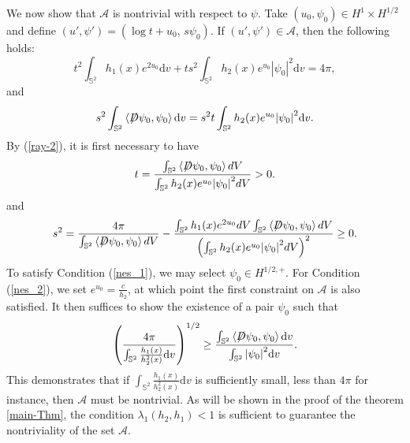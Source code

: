 \documentclass[a4paper, 12pt]{article}
\def\slashiii#1{\setbox0=\hbox{$#1$}#1\hskip-\wd0\hbox to\wd0{\hss\sl/\/\hss}}
\begin{document}
We now show that \(\mathcal{A}\) is nontrivial with respect to $\psi$. Take \((u_0, \psi_0) \in H^1 \times H^{1/2}\) and define \((u', \psi') = (\log t + u_0,\, s\psi_0)\). If \((u', \psi') \in \mathcal{A}\), then the following holds:
\begin{equation}\label{ray-1}
	{t^2}\int_{{\mathbb{S}^2}} {{h_1}(x){e^{2{u_0}}}} {\text{d}}v + t{s^2}\int_{{\mathbb{S}^2}} {{h_2}(x){e^{{u_0}}}{{\left| {{\psi _0}} \right|}^2}} {\text{d}}v = 4\pi,
\end{equation}
and
\begin{equation}\label{ray-2}
	{s^2}\int_{{\mathbb{S}^2}} {\left\langle {\slashiii{D}{\psi _0},{\psi _0}} \right\rangle {\text{d}}v}  = {s^2}t\int_{{\mathbb{S}^2}} {{h_2}(x){e^{{u_0}}}{{\left| {{\psi _0}} \right|}^2}{\text{d}}v}.
\end{equation}
By (\ref{ray-2}), it is first necessary to have
\begin{equation}\label{nes_1}
	t = \frac{{\int_{{\mathbb{S}^2}} {\left\langle {\slashiii{D}{\psi _0},{\psi _0}} \right\rangle dV} }}{{\int_{{\mathbb{S}^2}} {{h_2}(x){e^{{u_0}}}{{\left| {{\psi _0}} \right|}^2}dV} }} > 0.
\end{equation}
and
\begin{equation}\label{nes_2}
	{s^2} = \frac{{4\pi }}{{\int_{{\mathbb{S}^2}} {\left\langle {\slashiii{D}\psi_0 ,\psi_0 } \right\rangle dV} }} - \frac{{\int_{{\mathbb{S}^2}} {{h_1}(x){e^{2u_0}}} dV\int_{{\mathbb{S}^2}} {\left\langle {\slashiii{D}\psi_0 ,\psi_0 } \right\rangle dV} }}{{{{\left( {\int_{{\mathbb{S}^2}} {{h_2}(x){e^{u_0}}{{\left| \psi_0  \right|}^2}} dV} \right)}^2}}} \geq 0.
\end{equation}
To satisfy Condition (\ref{nes_1}), we may select \( \psi_0 \in H^{1/2,+} \). For Condition (\ref{nes_2}), we set \( e^{u_0} = \frac{c}{h_2} \), at which point the first constraint on $\mathcal{A}$ is also satisfied. It then suffices to show the existence of a pair \( \psi_0 \) such that	
\[
{\left( {\frac{{4\pi }}{{\int_{{\mathbb{S}^2}} {\frac{{{h_1}(x)}}{{h_2^2(x)}}} {\text{d}}v}}} \right)^{1/2}} \geq \frac{{\int_{{\mathbb{S}^2}} {\left\langle {\slashiii{D}{\psi _0},{\psi _0}} \right\rangle {\text{d}}v} }}{{\int_{{\mathbb{S}^2}} {{{\left| {{\psi _0}} \right|}^2}} {\text{d}}v}}.
\]
This demonstrates that if ${\int_{{\mathbb{S}^2}} {\frac{{{h_1}(x)}}{{h_2^2(x)}}} {\text{d}}v}$ is sufficiently small, less than $4\pi$ for instance, then $\mathcal{A}$ must be nontrivial. As will be shown in the proof of the theorem \ref{main-Thm}, the condition \(\lambda_1(h_2, h_1) < 1\) is sufficient to guarantee the nontriviality of the set \(\mathcal{A}\).
\end{document}
